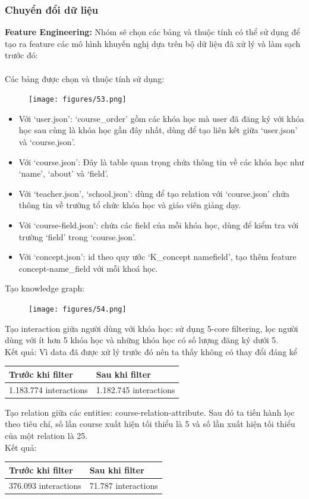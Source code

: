 \subsubsection{Chuyển đổi dữ liệu}
\textbf{Feature Engineering:}
Nhóm sẽ chọn các bảng và thuộc tính có thể sử dụng để tạo ra feature các mô hình khuyến nghị dựa trên bộ dữ liệu đã xử lý và làm sạch trước đó:\\
\\
Các bảng được chọn và thuộc tính sử dụng:
\begin{figure}[H]
    \centering
    \texttt{[image: figures/53.png]}
\end{figure}
\newpage
\begin{itemize}
    \item Với ‘user.json’: ‘course\_order’ gồm các khóa học mà user đã đăng ký với khóa học sau cùng là khóa học gần đây nhất, dùng để tạo liên kết giữa ‘user.json’ và ‘course.json’.
    \item Với ‘course.json’: Đây là table quan trọng chứa thông tin về các khóa học như ‘name’, ‘about’ và ‘field’.
    \item Với ‘teacher.json’, ‘school.json’: dùng để tạo relation với ‘course.json’ chứa thông tin về trường tổ chức khóa học và giáo viên giảng dạy.
    \item Với ‘course-field.json’: chứa các field của mỗi khóa học, dùng để kiểm tra với trường ‘field’ trong ‘course.json’.
    \item Với ‘concept.json’: id theo quy ước ‘K\_{concept name}{field}’, tạo thêm feature concept-name\_field với mỗi khoá học.
\end{itemize}
Tạo knowledge graph:
\begin{figure}[H]
    \centering
    \texttt{[image: figures/54.png]}
\end{figure}
Tạo interaction giữa người dùng với khóa học: sử dụng 5-core filtering, lọc người dùng với ít hơn 5 khóa học và những khóa học có số lượng đăng ký dưới 5.\\
Kết quả: Vì data đã được xử lý trước đó nên ta thấy không có thay đổi đáng kể
\begin{center}
\begin{tabular}{|| m{15em}  m{15em}||} 
 \hline
 Trước khi filter & Sau khi filter\\ [0.5ex] 
 \hline\hline
 1.183.774 interactions & 1.182.745 interactions \\ [1ex]
 \hline
\end{tabular}
\end{center}
\newpage
Tạo relation giữa các entities: course-relation-attribute. Sau đó ta tiến hành lọc theo tiêu chí, số lần course xuất hiện tối thiểu là 5 và số lần xuất hiện tối thiểu của một relation là 25. \\
Kết quả: 
\begin{center}
\begin{tabular}{|| m{15em}  m{15em}||} 
 \hline
 Trước khi filter & Sau khi filter\\ [0.5ex] 
 \hline\hline
 376.093 interactions & 71.787 interactions \\ [1ex]
 \hline
\end{tabular}
\end{center}
